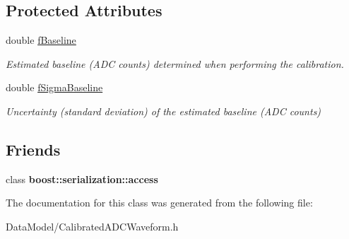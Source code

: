 \subsection*{Protected Attributes}
\begin{DoxyCompactItemize}
\item 
\hypertarget{classCalibratedADCWaveform_a149f3756091ef8101f03db1740db9caf}{double \hyperlink{classCalibratedADCWaveform_a149f3756091ef8101f03db1740db9caf}{f\-Baseline}}\label{classCalibratedADCWaveform_a149f3756091ef8101f03db1740db9caf}

\begin{DoxyCompactList}\small\item\em Estimated baseline (A\-D\-C counts) determined when performing the calibration. \end{DoxyCompactList}\item 
\hypertarget{classCalibratedADCWaveform_afad42e8ea016aa63d12da79d99b9a40c}{double \hyperlink{classCalibratedADCWaveform_afad42e8ea016aa63d12da79d99b9a40c}{f\-Sigma\-Baseline}}\label{classCalibratedADCWaveform_afad42e8ea016aa63d12da79d99b9a40c}

\begin{DoxyCompactList}\small\item\em Uncertainty (standard deviation) of the estimated baseline (A\-D\-C counts) \end{DoxyCompactList}\end{DoxyCompactItemize}
\subsection*{Friends}
\begin{DoxyCompactItemize}
\item 
\hypertarget{classCalibratedADCWaveform_ac98d07dd8f7b70e16ccb9a01abf56b9c}{class {\bfseries boost\-::serialization\-::access}}\label{classCalibratedADCWaveform_ac98d07dd8f7b70e16ccb9a01abf56b9c}

\end{DoxyCompactItemize}


The documentation for this class was generated from the following file\-:\begin{DoxyCompactItemize}
\item 
Data\-Model/Calibrated\-A\-D\-C\-Waveform.\-h\end{DoxyCompactItemize}
